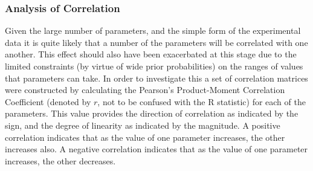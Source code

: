 \subsubsection{Analysis of Correlation}
Given the large number of parameters, and the simple form of the experimental data it is quite likely that a number of the parameters will be correlated with one another. This effect should also have been exacerbated at this stage due to the limited constraints (by virtue of wide prior probabilities) on the ranges of values that parameters can take. In order to investigate this a set of correlation matrices were constructed by calculating the Pearson's Product-Moment Correlation Coefficient (denoted by $r$, not to be confused with the R statistic) for each of the parameters. This value provides the direction of correlation as indicated by the sign, and the degree of linearity as indicated by the magnitude. A positive correlation indicates that as the value of one parameter increases, the other increases also. A negative correlation indicates that as the value of one parameter increases, the other decreases.

